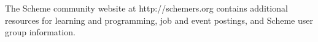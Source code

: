 

The Scheme community website at
{\cf http://schemers.org}
contains additional resources for learning and programming, job and
event postings, and Scheme user group information.
